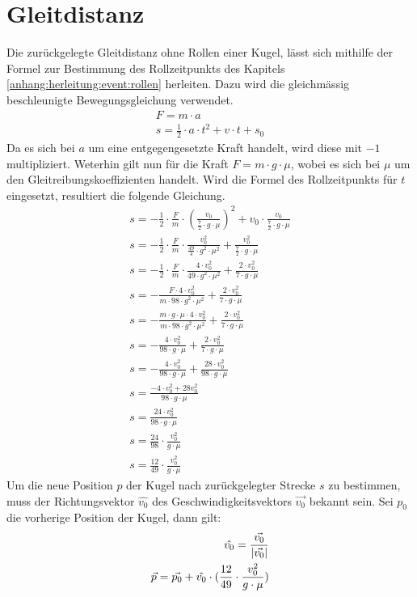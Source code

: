 \section{Gleitdistanz}\label{anhang:herleitung:gleitdistanz}
Die zurückgelegte Gleitdistanz ohne Rollen einer Kugel, lässt sich mithilfe der Formel zur Bestimmung des Rollzeitpunkts
des Kapitels \ref{anhang:herleitung:event:rollen} herleiten.
Dazu wird die gleichmässig beschleunigte Bewegungsgleichung verwendet.
\begin{align}
    F = m \cdot a\\
    s = \frac{1}{2} \cdot a \cdot t^2 + v \cdot t + s_0
\end{align}
Da es sich bei $a$ um eine entgegengesetzte Kraft handelt, wird diese mit $-1$ multipliziert. Weterhin gilt nun für die
Kraft $F = m \cdot g \cdot \mu$, wobei es sich bei $\mu$ um den Gleitreibungskoeffizienten handelt. Wird die Formel des Rollzeitpunkts
für $t$ eingesetzt, resultiert die folgende Gleichung.
\begin{align}
    s = -\frac{1}{2} \cdot \frac{F}{m} \cdot (\frac{v_0}{\frac{7}{2} \cdot g \cdot \mu})^2 + v_0 \cdot \frac{v_0}{\frac{7}{2} \cdot g \cdot \mu}\\
    s = -\frac{1}{2} \cdot \frac{F}{m} \cdot \frac{v_0^2}{\frac{49}{4} \cdot g^2 \cdot \mu^2} + \frac{v_0^2}{\frac{7}{2} \cdot g \cdot \mu}\\
    s = -\frac{1}{2} \cdot \frac{F}{m} \cdot \frac{4 \cdot v_0^2}{49 \cdot g^2 \cdot \mu^2} + \frac{2 \cdot v_0^2}{7 \cdot g \cdot \mu}\\
    s = -\frac{F \cdot 4 \cdot v_0^2}{m \cdot 98 \cdot g^2 \cdot \mu^2} + \frac{2 \cdot v_0^2}{7 \cdot g \cdot \mu}\\
    s = -\frac{m \cdot g \cdot \mu \cdot 4 \cdot v_0^2}{m \cdot 98 \cdot g^2 \cdot \mu^2} + \frac{2 \cdot v_0^2}{7 \cdot g \cdot \mu}\\
    s = -\frac{4 \cdot v_0^2}{98 \cdot g \cdot \mu} + \frac{2 \cdot v_0^2}{7 \cdot g \cdot \mu}\\
    s = -\frac{4 \cdot v_0^2}{98 \cdot g \cdot \mu} + \frac{28 \cdot v_0^2}{98 \cdot g \cdot \mu}\\
    s = \frac{-4 \cdot v_0^2 + 28 v_0^2}{98 \cdot g \cdot \mu}\\
    s = \frac{24 \cdot v_0^2}{98 \cdot g \cdot \mu}\\
    s = \frac{24}{98} \cdot \frac{v_0^2}{g \cdot \mu}\\
    s = \frac{12}{49} \cdot \frac{v_0^2}{g \cdot \mu}
\end{align}
Um die neue Position $p$ der Kugel nach zurückgelegter Strecke $s$ zu bestimmen, muss der Richtungsvektor $\hat{v_0}$
des Geschwindigkeitsvektors $\vec{v_0}$ bekannt sein. Sei $p_0$ die vorherige Position der Kugel, dann gilt:
\begin{align}
    \hat{v_0} = \frac{\vec{v_0}}{\lvert \vec{v_0} \rvert}\\
    \vec{p} = \vec{p_0} + \hat{v_0} \cdot (\frac{12}{49} \cdot \frac{v_0^2}{g \cdot \mu})
\end{align}
